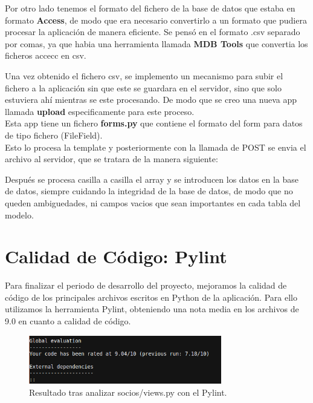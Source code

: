 Por otro lado tenemos el formato del fichero de la base de datos que estaba en formato \textbf{Access}, de modo que era necesario convertirlo a un formato que pudiera procesar la aplicación de manera eficiente. Se pensó 
en el formato .csv separado por comas, ya que habia una herramienta llamada \textbf{MDB Tools} que convertia los ficheros accecc en csv.

Una vez obtenido el fichero csv, se implemento un mecanismo para subir el fichero a la aplicación sin que este se guardara en el servidor, sino que solo estuviera ahí mientras se este procesando. De modo que se creo 
una nueva app llamada \textbf{upload} especificamente para este proceso.\\

Esta app tiene un fichero \textbf{forms.py} que contiene el formato del form para datos de tipo fichero (FileField).\\


\bigskip
Esto lo procesa la template y posteriormente con la llamada de POST se envia el archivo al servidor, que se tratara de la manera siguiente:
\bigskip


Después se procesa casilla a casilla el array y se introducen los datos en la base de datos, siempre cuidando la integridad de la base de datos, de modo que no queden ambiguedades, ni campos vacios que sean importantes 
en cada tabla del modelo.\\

\section{Calidad de Código: Pylint}
\label{4:sec12}
Para finalizar el periodo de desarrollo del proyecto, mejoramos la calidad de código de los principales archivos escritos en Python de la aplicación. Para ello utilizamos la herramienta Pylint, obteniendo una nota media en los
archivos de 9.0 en cuanto a calidad de código.\\


\begin{figure}[H]
\begin{center}
\includegraphics[width=0.75\textwidth]{images/pylint.jpg}
\caption{Resultado tras analizar socios/views.py con el Pylint.}
\label{fig:ArbolBinario}
\end{center}
\end{figure}








